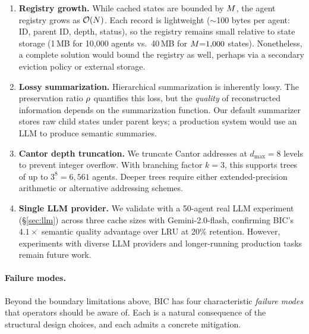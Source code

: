 \begin{enumerate}
\item \textbf{Registry growth.}  While cached states are bounded by
  $M$, the agent registry grows as $\mathcal{O}(N)$.  Each record is
  lightweight ($\sim$100 bytes per agent: ID, parent ID, depth,
  status), so the registry remains small relative to state storage
  (1\,MB for 10{,}000 agents vs.\ 40\,MB for $M{=}1{,}000$ states).
  Nonetheless, a complete solution would bound the registry as well,
  perhaps via a secondary eviction policy or external storage.

\item \textbf{Lossy summarization.}  Hierarchical summarization is
  inherently lossy.  The preservation ratio $\rho$ quantifies this
  loss, but the \emph{quality} of reconstructed information depends on
  the summarization function.  Our default summarizer stores raw child
  states under parent keys; a production system would use an LLM to
  produce semantic summaries.

\item \textbf{Cantor depth truncation.}  We truncate Cantor addresses
  at $d_{\max} = 8$ levels to prevent integer overflow.  With branching
  factor $k{=}3$, this supports trees of up to $3^8 = 6{,}561$ agents.
  Deeper trees require either extended-precision arithmetic or
  alternative addressing schemes.

\item \textbf{Single LLM provider.}  We validate with a 50-agent
  real LLM experiment (\S\ref{sec:llm}) across three cache sizes with
  Gemini-2.0-flash, confirming BIC's $4.1\times$ semantic quality
  advantage over LRU at 20\% retention.  However, experiments with
  diverse LLM providers and longer-running production tasks remain
  future work.
\end{enumerate}

\paragraph{Failure modes.}
\label{sec:failure-modes}
Beyond the boundary limitations above, BIC has four characteristic
\emph{failure modes} that operators should be aware of.  Each is a
natural consequence of the structural design choices, and each admits
a concrete mitigation.

